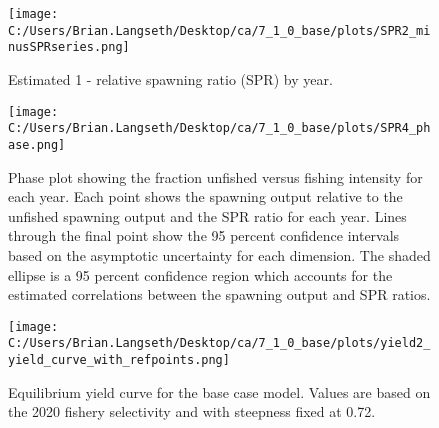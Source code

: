 \documentclass[11pt,
  english,
  a4paper,
]{article}
\begin{document}
\tagmcend\tagstructend


\begin{figure}
\centering
\texttt{[image: C:/Users/Brian.Langseth/Desktop/ca/7\_1\_0\_base/plots/SPR2\_minusSPRseries.png]}
\caption{Estimated 1 - relative spawning ratio (SPR) by year.\label{fig:1-spr}}
\end{figure}

\tagmcend\tagstructend


\begin{figure}
\centering
\texttt{[image: C:/Users/Brian.Langseth/Desktop/ca/7\_1\_0\_base/plots/SPR4\_phase.png]}
\caption{Phase plot showing the fraction unfished versus fishing intensity for each year. Each point shows the spawning output relative to the unfished spawning output and the SPR ratio for each year. Lines through the final point show the 95 percent confidence intervals based on the asymptotic uncertainty for each dimension. The shaded ellipse is a 95 percent confidence region which accounts for the estimated correlations between the spawning output and SPR ratios.\label{fig:phase-plot}}
\end{figure}

\tagmcend\tagstructend


\begin{figure}
\centering
\texttt{[image: C:/Users/Brian.Langseth/Desktop/ca/7\_1\_0\_base/plots/yield2\_yield\_curve\_with\_refpoints.png]}
\caption{Equilibrium yield curve for the base case model. Values are based on the 2020 fishery selectivity and with steepness fixed at 0.72.\label{fig:yield}}
\end{figure}
\end{document}
